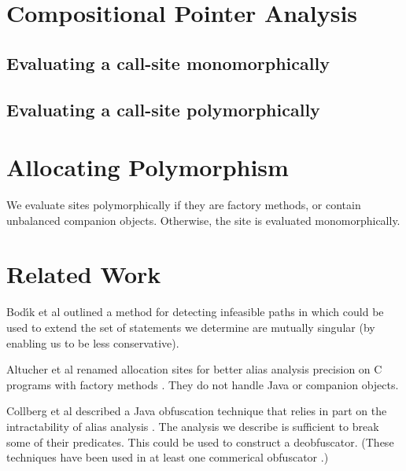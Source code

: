 \documentclass[11pt,notitlepage]{article}
\begin{document}
\section{Compositional Pointer Analysis}

\subsection{Evaluating a call-site monomorphically}
\subsection{Evaluating a call-site polymorphically}

\section{Allocating Polymorphism}

We evaluate sites polymorphically if they are factory methods, or
contain unbalanced companion objects.  Otherwise, the site is
evaluated monomorphically.

\section{Related Work}

Bod{\'\i}k et al outlined a method for detecting infeasible paths
in \cite{267921} which could be used to extend the set of statements
we determine are mutually singular (by enabling us to be less conservative).

Altucher et al renamed allocation sites for better alias analysis
precision on C programs with factory methods \cite{199466}.  They
do not handle Java or companion objects.

Collberg et al described a Java obfuscation technique that relies in
part on the intractability of alias analysis \cite{268962}.  The
analysis we describe is sufficient to break some of their predicates.
This could be used to construct a deobfuscator.  (These techniques
have been used in at least one commerical obfuscator \cite{humper02}.)



\end{document}
